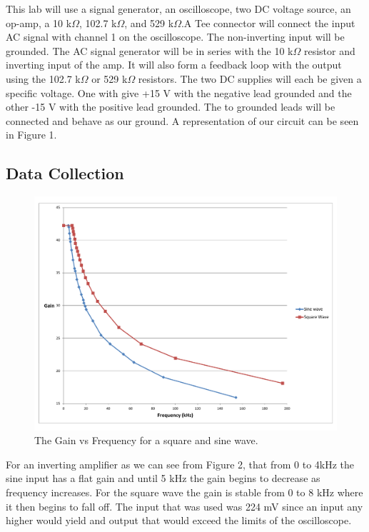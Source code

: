 \documentclass[11pt,letterpaper,onecolumn]{article}
\begin{document}
This lab will use a signal generator, an oscilloscope, two DC voltage source, an op-amp, a 10 k$\Omega$, 102.7 k$\Omega$, and 529 k$\Omega$.A Tee connector will connect the input AC signal with channel 1 on the oscilloscope. The non-inverting input will be grounded. The AC signal generator will be in series with the 10 k$\Omega$ resistor and inverting input of the amp. It will also form a feedback loop with the output using the 102.7 k$\Omega$ or 529 k$\Omega$ resistors. The two DC supplies will each be given a specific voltage. One with give +15 V with the negative lead grounded and the other -15 V with the positive lead grounded. The to grounded leads will be connected and behave as our ground. A representation of our circuit can be seen in Figure 1.  



\subsection{Data Collection}

\begin{figure}[H]
    \centering
    \includegraphics[scale = .5]{Graph1.pdf}
    \caption{The Gain vs Frequency for a square and sine wave.}
    \label{fig:grph1}
\end{figure}

For an inverting amplifier as we can see from Figure 2, that from 0 to 4kHz the sine input has a flat gain and until 5 kHz the gain begins to decrease as frequency increases. For the square wave the gain is stable from 0 to 8 kHz where it then begins to fall off. The input that was used was 224 mV since an input any higher would yield and output that would exceed the limits of the oscilloscope. 
\end{document}
